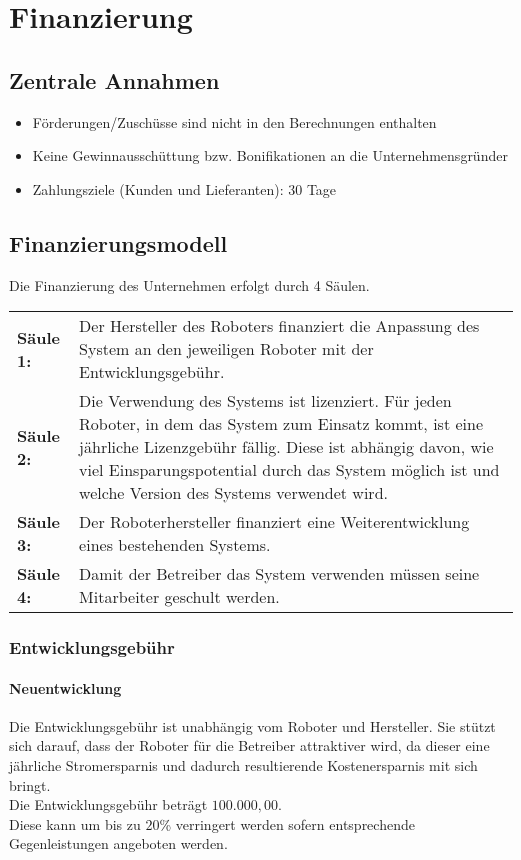 \chapter{Finanzierung}
\section{Zentrale Annahmen}
\begin{itemize}
	\item Förderungen/Zuschüsse sind nicht in den Berechnungen enthalten
	\item Keine Gewinnausschüttung bzw. Bonifikationen an die Unternehmensgründer
	\item Zahlungsziele (Kunden und Lieferanten): 30 Tage
\end{itemize}

\section{Finanzierungsmodell}
Die Finanzierung des Unternehmen erfolgt durch 4 Säulen. 

\noindent
\begin{tabular}{@{}>{\raggedright\arraybackslash}p{1.8cm}@{}>{\raggedright\arraybackslash}p{\textwidth - 1.8cm}}
 
	\textbf{Säule 1:} & Der Hersteller des Roboters finanziert die Anpassung des System an den jeweiligen Roboter mit der Entwicklungsgebühr. \\ 

	\textbf{Säule 2:} & Die Verwendung des Systems ist lizenziert. Für jeden Roboter, in dem das System zum Einsatz kommt, ist eine jährliche Lizenzgebühr fällig. Diese ist abhängig davon, wie viel Einsparungspotential durch das System möglich ist und welche Version des Systems verwendet wird. \\
	
	\textbf{Säule 3:} & Der Roboterhersteller finanziert eine Weiterentwicklung eines bestehenden Systems. \\
	
	\textbf{Säule 4:} & Damit der Betreiber das System verwenden müssen seine Mitarbeiter geschult werden.
\end{tabular}

\subsection{Entwicklungsgebühr}
\subsubsection{Neuentwicklung}
Die Entwicklungsgebühr ist unabhängig vom Roboter und Hersteller. Sie stützt sich darauf, dass der Roboter für die Betreiber attraktiver wird, da dieser eine jährliche Stromersparnis und dadurch resultierende Kostenersparnis mit sich bringt.\\
Die Entwicklungsgebühr beträgt $100.000,00$\officialeuro.\\
Diese kann um bis zu $20$\% verringert werden sofern entsprechende Gegenleistungen angeboten werden.

